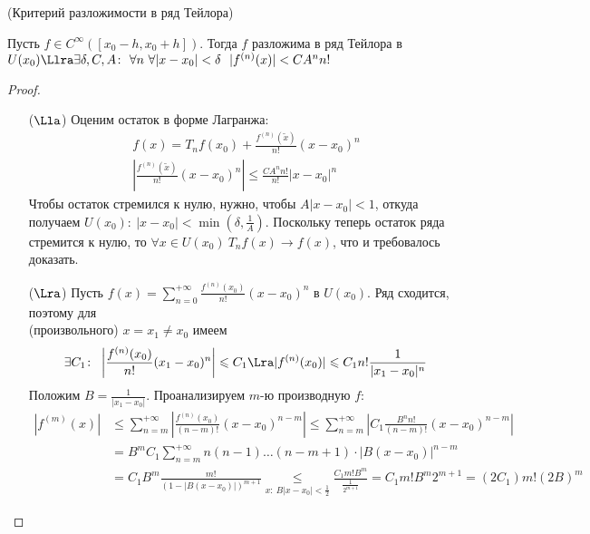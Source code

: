 \begin{theorem}(Критерий разложимости в ряд Тейлора)

    Пусть $f \in C^{\infty}([x_0 - h, x_0 + h])$. Тогда $f$ разложима в ряд
    Тейлора в $U(x_0) \Llra \exists \delta, C, A\colon~ \forall n~
    \forall |x - x_0| < \delta~~ |f^{(n)}(x)| < C A^n n!$
\end{theorem}
\begin{proof}
    \enewline
    \begin{itemize}
        \item[($\Lla$)] Оценим остаток в форме Лагранжа:
\begin{align*}
    f(x) = T_nf(x_0) + \frac{f^{(n)}(\tilde{x})}{n!}(x - x_0)^n \\
    \left|\frac{f^{(n)}(\tilde{x})}{n!}(x - x_0)^n\right| \leqslant
    \frac{CA^n n!}{n!}|x - x_0|^n
\end{align*}
    Чтобы остаток стремился к нулю, нужно, чтобы $A|x - x_0| < 1$, откуда
    получаем $U(x_0)\colon~ |x - x_0| < \min(\delta, \frac{1}{A})$. Поскольку
    теперь остаток ряда стремится к нулю, то $\forall x \in U(x_0)~
    T_nf(x) \to f(x)$, что и требовалось доказать.
        \item[($\Lra$)] Пусть $\displaystyle f(x) = \sum_{n = 0}^{+\infty}
        {\frac{f^{(n)}(x_0)}{n!}(x - x_0)^n}$ в $U(x_0)$. Ряд сходится, поэтому
        для \\ (произвольного) $x = x_1 \neq x_0$ имеем
\[
    \exists C_1\colon~ \left|\frac{f^{(n)}(x_0)}{n!}(x_1 - x_0)^n\right| \leqslant
    C_1 \Lra |f^{(n)}(x_0)| \leqslant C_1 n! \frac{1}{|x_1 - x_0|^n}
\]
        Положим $\displaystyle B = \frac{1}{|x_1 - x_0|}$. Проанализируем
        $m$-ю производную $f$:
\begin{align*}
    |f^{(m)}(x)| &\leqslant \sum_{n = m}^{+\infty}
    {\left|\frac{f^{(n)}(x_0)}{(n - m)!}(x - x_0)^{n - m}\right|}
    \leqslant \sum_{n = m}^{+\infty}{\left|C_1 \frac{B^n n!}{(n - m)!}(x - x_0)^{n
    - m}\right|} \\
    &= B^m C_1 \sum_{n = m}^{+\infty}{n(n - 1)\ldots(n - m + 1) \cdot |B(x -
    x_0)|^{n - m}} \\
    &= C_1 B^m \frac{m!}{(1 - |B(x - x_0)|)^{m + 1}}
    \underset{x\colon~ B|x - x_0| < \frac{1}{2}}{\leqslant} \frac{C_1 m!
    B^m}{\frac{1}{2^{m + 1}}} = C_1 m! B^m 2^{m + 1} = (2C_1)m! (2B)^m
\end{align*}
\end{itemize}
\end{proof}

